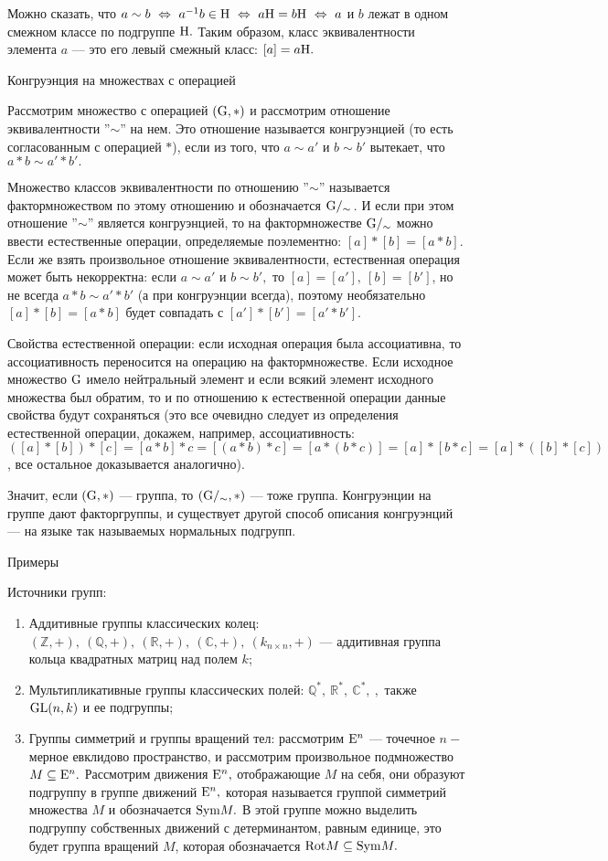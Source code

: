 Можно сказать, что $a\sim b\ \Leftrightarrow\  a^{-1}b\in{\rm H}\ \Leftrightarrow\  a{\rm H}=b{\rm H}\ \Leftrightarrow\  a$ и $b$ лежат в одном смежном классе по подгруппе ${\rm H}.$
Таким образом, класс эквивалентности элемента $a$ --- это его левый смежный класс:
$[a]=a{\rm H}.$

\centerline{Конгруэнция на множествах с операцией}
\medskip

Рассмотрим множество с операцией $({\rm G}, *)$ и рассмотрим отношение эквивалентности ''$\sim$'' на нем.
Это отношение называется конгруэнцией (то есть согласованным с операцией $*$), если из того, что $a\sim a'$ и $b\sim b'$
вытекает, что $a*b\sim a'*b'.$

\de Множество классов эквивалентности по отношению ''$\sim$'' называется фактормножеством по этому отношению и
обозначается ${\rm G}/_\sim$\,. И если при этом отношение ''$\sim$'' является конгруэнцией, то на фактормножестве ${\rm G}/_\sim$
можно ввести естественные операции, определяемые поэлементно: $[a]*[b]=[a*b].$
Если же взять произвольное отношение эквивалентности, естественная операция может быть некорректна: если $a\sim a'$ и $b\sim b',$ то
$[a]=[a'],\ [b]=[b']$, но не всегда $a*b\sim a'*b'$ (а при конгруэнции всегда), поэтому необязательно $[a]*[b]=[a*b]$
 будет совпадать с $[a']*[b']=[a'*b'].$

Свойства естественной операции: если исходная операция была ассоциативна, то ассоциативность переносится на операцию на фактормножестве.
Если исходное множество ${\rm G}$ имело нейтральный элемент и если всякий элемент исходного множества был обратим,
то и по отношению к естественной операции данные свойства будут сохраняться (это все очевидно следует из определения
естественной операции, докажем, например, ассоциативность: $([a]*[b])*[c]=[a*b]*c=[(a*b)*c]=[a*(b*c)]=[a]*[b*c]=[a]*([b]*[c])$, все остальное доказывается аналогично).

Значит, если $({\rm G},*)$ --- группа, то $({\rm G}/_\sim,*)$ --- тоже группа. Конгруэнции на группе дают факторгруппы, и существует
другой способ описания конгруэнций --- на языке так называемых нормальных подгрупп.

\centerline{Примеры}
\medskip

Источники групп:
\begin{enumerate}
    \item Аддитивные группы классических колец: $(\mathbb Z,+),\ (\mathbb Q,+),\ (\mathbb R,+),\ (\mathbb C,+),\ (k_{n\times n},+)$ --- аддитивная группа кольца квадратных матриц над полем $k$;
    \item Мультипликативные группы классических полей: $\mathbb Q^*,\ \mathbb R^*,\ \mathbb C^*,\ ,$ также ${\rm GL}(n,k)$ и ее подгруппы;
    \item Группы симметрий и группы вращений тел: рассмотрим ${\rm E}^n$ --- точечное $n-$мерное евклидово пространство, и рассмотрим произвольное подмножество $M\subseteq{\rm E}^n.$ Рассмотрим движения ${\rm E}^n,$ отображающие
    $M$ на себя, они образуют подгруппу в группе движений ${\rm E}^n,$ которая называется группой симметрий множества $M$ и обозначается ${\rm Sym} M.$
    В этой группе можно выделить подгруппу собственных движений с детерминантом, равным единице, это будет группа вращений $M$, которая обозначается ${\rm Rot}M\subseteq{\rm Sym}M.$
\end{enumerate}

